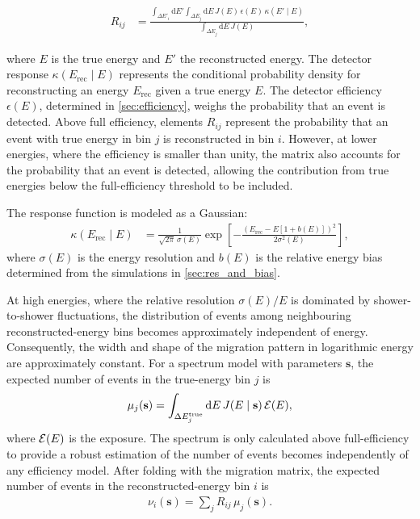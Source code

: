 \documentclass[main.tex]{subfiles}
\begin{document}
\begin{align}
R_{ij}
&=
\frac{
    \displaystyle
    \int_{\Delta E'_i} \mathrm{d}E'
    \int_{\Delta E_j} \mathrm{d}E\,
    J(E)\,\epsilon(E)\,\kappa(E'\mid E)
}{
    \displaystyle
    \int_{\Delta E_j} \mathrm{d}E\,J(E)
},
\label{eq:migration_matrix2}
\end{align}

where $E$ is the true energy and $E'$ the reconstructed energy. The detector response $\kappa(E_{\mathrm{rec}}\mid E)$ represents the conditional probability density for reconstructing an energy $E_{\mathrm{rec}}$ given a true energy $E$.
The detector efficiency $\epsilon(E)$, determined in \cref{sec:efficiency}, weighs the probability that an event is detected.
Above full efficiency, elements $R_{ij}$ represent the probability that an event with true energy in bin $j$ is reconstructed in bin $i$.
However, at lower energies, where the efficiency is smaller than unity, the matrix also accounts for the probability that an event is detected, allowing the contribution from true energies below the full-efficiency threshold to be included.

The response function is modeled as a Gaussian:
\begin{align}
    \kappa(E_{\mathrm{rec}}\mid E)
    &=
    \frac{1}{\sqrt{2\pi}\,\sigma(E)}
    \exp\left[
        -\frac{
            \left(
                E_{\mathrm{rec}}-E\left[1+b(E)\right]
            \right)^2
        }{
            2\sigma^2(E)
        }
    \right],
    \label{eq:resolution_function}
\end{align}
where $\sigma(E)$ is the energy resolution and $b(E)$ is the relative energy bias determined from the simulations in \cref{sec:res_and_bias}.


At high energies, where the relative resolution $\sigma(E)/E$ is dominated by shower-to-shower fluctuations, the distribution of events among neighbouring reconstructed-energy bins becomes approximately independent of energy.
Consequently, the width and shape of the migration pattern in logarithmic energy are approximately constant.
For a spectrum model with parameters $\mathbf{s}$, the expected number of events in the true-energy bin $j$ is
\begin{align}
    \mu_j(\mathbf{s})
    =
    \int_{\Delta E_j^{\mathrm{true}}}
    \mathrm{d}E\,J(E\mid\mathbf{s}) \, \mathcal{E}(E),
    \label{eq:expected_true_counts}
\end{align}
where $\mathcal{E}(E)$ is the exposure. 
The spectrum is only calculated above full-efficiency to provide a robust estimation of the number of events becomes independently of any efficiency model.  
After folding with the migration matrix, the expected number of events in the reconstructed-energy bin $i$ is
\begin{align}
    \nu_i(\mathbf{s})
    =
    \sum_j R_{ij}\,\mu_j(\mathbf{s}).
    \label{eq:expected_reconstructed_counts}
\end{align}
\end{document}
